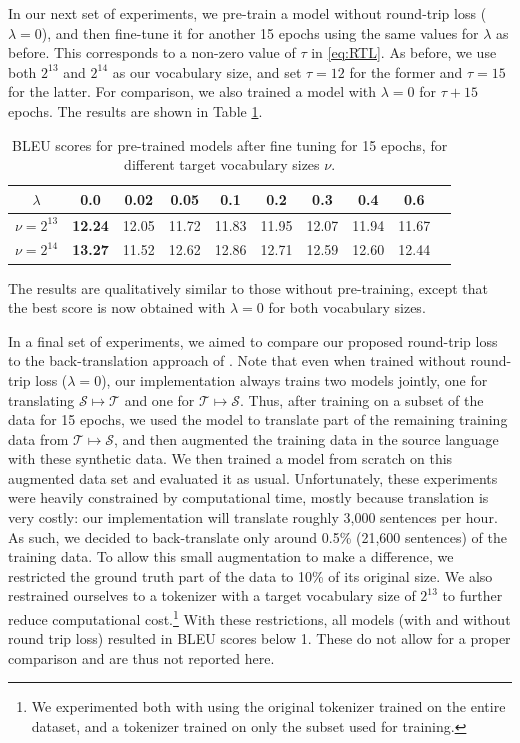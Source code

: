 \documentclass[10pt,a4paper]{article}
\begin{document}
In our next set of experiments, we pre-train a model without round-trip loss ($\lambda=0$), and then fine-tune it for another 15 epochs using the same values for $\lambda$ as before. This corresponds to a non-zero value of $\tau$ in \eqref{eq:RTL}. As before, we use both $2^{13}$ and $2^{14}$ as our vocabulary size, and set $\tau=12$ for the former and $\tau=15$ for the latter. For comparison, we also trained a model with $\lambda=0$ for $\tau+15$ epochs. The results are shown in Table \ref{tab:result2}.

\begin{table} [ht]
\centering
\small
\begin{tabular}{lccccccccc}
	\toprule
  \multicolumn{1}{c}{$\lambda$} & 0.0 & 0.02 & 0.05 & 0.1 & 0.2 & 0.3 & 0.4 & 0.6 \\ \midrule
  $\nu=2^{13}$ & \textbf{12.24} & 12.05 & 11.72 & 11.83 & 11.95 & 12.07 & 11.94 & 11.67 \\
  $\nu=2^{14}$ & \textbf{13.27} & 11.52 & 12.62 & 12.86 & 12.71 & 12.59 & 12.60 & 12.44 \\
\bottomrule
\end{tabular}
\caption{BLEU scores for pre-trained models after fine tuning for 15 epochs, for different target vocabulary sizes $\nu$.}
\label{tab:result2}
\end{table}

The results are qualitatively similar to those without pre-training, except that the best score is now obtained with $\lambda=0$ for both vocabulary sizes.

In a final set of experiments, we aimed to compare our proposed round-trip loss to the back-translation approach of \citet{backtrans}. Note that even when trained without round-trip loss ($\lambda=0$), our implementation always trains two models jointly, one for translating $\mathcal{S}\mapsto\mathcal{T}$ and one for $\mathcal{T}\mapsto\mathcal{S}$. Thus, after training on a subset of the data for 15 epochs, we used the model to translate part of the remaining training data from $\mathcal{T}\mapsto\mathcal{S}$, and then augmented the training data in the source language with these synthetic data. We then trained a model from scratch on this augmented data set and evaluated it as usual. Unfortunately, these experiments were heavily constrained by computational time, mostly because translation is very costly: our implementation will translate roughly 3,000 sentences per hour. As such, we decided to back-translate only around 0.5\% (21,600 sentences) of the training data. To allow this small augmentation to make a difference, we restricted the ground truth part of the data to 10\% of its original size. We also restrained ourselves to a tokenizer with a target vocabulary size of  $2^{13}$ to further reduce computational cost.\footnote{We experimented both with using the original tokenizer trained on the entire dataset, and a tokenizer trained on only the subset used for training.} With these restrictions, all models (with and without round trip loss)  resulted in BLEU scores below 1. These do not allow for a proper comparison and are thus not reported here.
\end{document}
